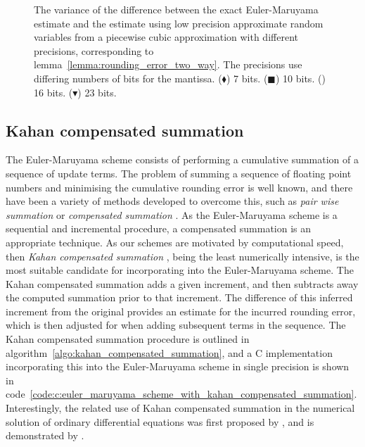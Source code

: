 \documentclass[manuscript,review]{acmart}
\begin{document}
\begin{figure}[htb]
\centering
\hfil
{}\hfil 
{}\hfil

\caption{The variance of the difference between the exact Euler-Maruyama estimate and the estimate using low precision approximate random variables from a piecewise cubic approximation with different precisions, corresponding to lemma~\ref{lemma:rounding_error_two_way}. The precisions use differing numbers of bits for the mantissa. ($ \blacklozenge $) 7 bits. ($ \blacksquare $) 10 bits. (\raisebox{-0.1em}{\huge$ \bullet$})
16 bits. ({\large $ \blacktriangledown $}) 23 bits.}
\label{fig:two_way_variances}
\end{figure}

\subsection{Kahan compensated summation}
\label{sec:kahan_compensated_summation}

The Euler-Maruyama scheme consists of performing a cumulative summation of a sequence of update terms. The problem of summing a sequence of floating point numbers and minimising the cumulative rounding error is well known, and there have been a variety of methods developed to overcome this, such as \emph{pair wise summation} or \emph{compensated summation} \citep[4.1]{higham2002accuracy}. As the Euler-Maruyama scheme is a sequential and incremental procedure, a compensated summation is an appropriate technique. As our schemes are motivated by computational speed, then \emph{Kahan compensated summation} \citep{kahan1965further}, being the least numerically intensive, is the most suitable candidate for incorporating into the Euler-Maruyama scheme. The Kahan compensated summation adds a given increment, and then subtracts away the computed summation prior to that increment. The difference of this inferred increment from the original provides an estimate for the incurred rounding error, which is then adjusted for when adding subsequent terms in the sequence. The Kahan compensated summation procedure is outlined in algorithm~\ref{algo:kahan_compensated_summation}, and a C implementation incorporating this into the Euler-Maruyama scheme in single precision is shown in code~\ref{code:c:euler_maruyama_scheme_with_kahan_compensated_summation}. Interestingly, the related use of Kahan compensated summation in the numerical solution of ordinary differential equations was first proposed by \citet{vitasek1969numerical}, and is demonstrated by \citet[pages~86--87]{higham1993accuracy}.
\end{document}

